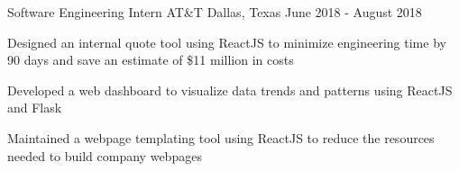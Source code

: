 \begin{cventries}

\cventry
{Software Engineering Intern} %
{AT\&T} %
{Dallas, Texas} %
{June 2018 - August 2018} %
{ %
\begin{cvitems}
\item {Designed an internal quote tool using ReactJS to minimize engineering time by 90 days and save an estimate of \$11 million in costs}
\item {Developed a web dashboard to visualize data trends and patterns using ReactJS and Flask}
\item {Maintained a webpage templating tool using ReactJS to reduce the resources needed to build company webpages}
\end{cvitems}
}


\end{cventries}
